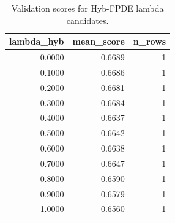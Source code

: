 \begin{table}[t]
\caption{Validation scores for Hyb-FPDE lambda candidates.}
\label{tab:lambda_distribution_computed}
\centering
\begin{tabular}{rrr}
\toprule
lambda\_hyb & mean\_score & n\_rows \\
\midrule
0.0000 & 0.6689 & 1 \\
0.1000 & 0.6686 & 1 \\
0.2000 & 0.6681 & 1 \\
0.3000 & 0.6684 & 1 \\
0.4000 & 0.6637 & 1 \\
0.5000 & 0.6642 & 1 \\
0.6000 & 0.6638 & 1 \\
0.7000 & 0.6647 & 1 \\
0.8000 & 0.6590 & 1 \\
0.9000 & 0.6579 & 1 \\
1.0000 & 0.6560 & 1 \\
\bottomrule
\end{tabular}

\end{table}
